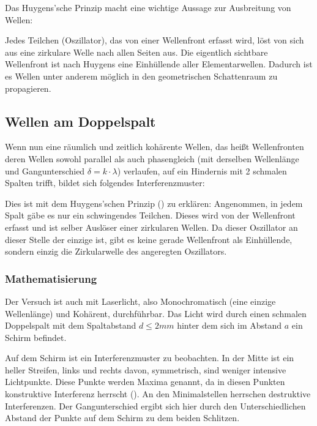 Das Huygens'sche Prinzip macht eine wichtige Aussage zur Ausbreitung von Wellen:

\glqq Jedes Teilchen (Oszillator), das von einer Wellenfront erfasst wird, löst von sich aus eine zirkulare Welle nach allen Seiten aus.\grqq{} Die eigentlich sichtbare Wellenfront ist nach Huygens eine Einhüllende aller \glqq Elementarwellen\grqq . Dadurch ist es Wellen unter anderem möglich in den geometrischen Schattenraum zu propagieren. 


\subsection{Wellen am Doppelspalt} \label{subsec:doppelspalt}

Wenn nun eine räumlich und zeitlich kohärente Wellen, das heißt Wellenfronten deren Wellen sowohl parallel als auch phasengleich (mit derselben Wellenlänge und Gangunterschied $\delta= k \cdot \lambda$) verlaufen, auf ein Hindernis mit 2 schmalen Spalten trifft, bildet sich folgendes Interferenzmuster:


Dies ist mit dem Huygens'schen Prinzip () zu erklären: Angenommen, in jedem Spalt gäbe es nur ein schwingendes Teilchen. Dieses wird von der Wellenfront erfasst und ist selber Auslöser einer zirkularen Wellen. Da dieser Oszillator an dieser Stelle der einzige ist, gibt es keine gerade Wellenfront als Einhüllende, sondern einzig die Zirkularwelle des angeregten Oszillators.


\subsubsection{Mathematisierung}

	Der Versuch ist auch mit Laserlicht, also Monochromatisch (eine einzige Wellenlänge) und Kohärent, durchführbar. Das Licht wird durch einen schmalen Doppelspalt mit dem Spaltabstand $d \leq 2mm$ hinter dem sich im Abstand $a$ ein Schirm befindet. 
	
	Auf dem Schirm ist ein Interferenzmuster zu beobachten. In der Mitte ist ein heller Streifen, links und rechts davon, symmetrisch, sind weniger intensive Lichtpunkte. Diese Punkte werden Maxima genannt, da in diesen Punkten konstruktive Interferenz herrscht (). An den Minimalstellen herrschen destruktive Interferenzen. Der Gangunterschied ergibt sich hier durch den Unterschiedlichen Abstand der Punkte auf dem Schirm zu dem beiden Schlitzen.
	
